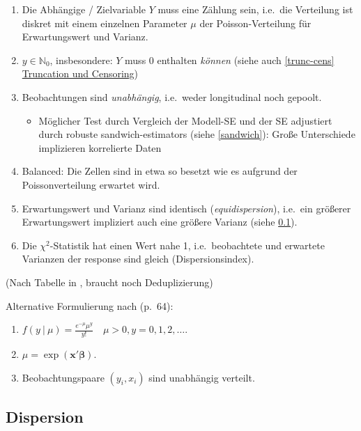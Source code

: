 \documentclass[ngerman,a4paper,]{scrartcl}
\providecommand{\tightlist}{%
  \setlength{\itemsep}{0pt}\setlength{\parskip}{0pt}}
\theoremstyle{definition}
\theoremstyle{definition}
\theoremstyle{definition}
\theoremstyle{remark}
\begin{document}
\begin{enumerate}
\def\labelenumi{\arabic{enumi}.}
\tightlist
\item
  Die Abhängige / Zielvariable \(Y\) muss eine Zählung sein, i.e.~die Verteilung ist diskret mit einem einzelnen Parameter \(\mu\) der Poisson-Verteilung für Erwartungswert und Varianz.
\item
  \(y \in \mathbb{N}_0\), insbesondere: \(Y\) muss 0 enthalten \emph{können} (siehe auch \ref{trunc-cens} \protect\hyperlink{trunc-cens}{Truncation und Censoring})
\item
  Beobachtungen sind \emph{unabhängig}, i.e.~weder longitudinal noch gepoolt.

  \begin{itemize}
  \tightlist
  \item
    Möglicher Test durch Vergleich der Modell-SE und der SE adjustiert durch robuste sandwich-estimators (siehe \ref{sandwich}): Große Unterschiede implizieren korrelierte Daten
  \end{itemize}
\item
  Balanced: Die Zellen sind in etwa so besetzt wie es aufgrund der Poissonverteilung erwartet wird.
\item
  Erwartungswert und Varianz sind identisch (\emph{equidispersion}), i.e.~ein größerer Erwartungswert impliziert auch eine größere Varianz (siehe \ref{dispersion}).
\item
  Die \(\chi^2\)-Statistik hat einen Wert nahe 1, i.e.~beobachtete und erwartete Varianzen der response sind gleich (Dispersionsindex).
\end{enumerate}

(Nach Tabelle in \citep{hilbeModelingCountData2014}, braucht noch Deduplizierung)

Alternative Formulierung nach \citet{winkelmannEconometricAnalysisCount2010} (p.~64):

\begin{enumerate}
\def\labelenumi{\arabic{enumi}.}
\tightlist
\item
  \(f(y\ |\ \mu) = \frac{e^{-\mu} \mu^y}{y!} \quad \mu > 0, y = 0, 1, 2, \ldots\).
\item
  \(\mu = \exp(\mathbf{x}' \boldsymbol{\beta})\).
\item
  Beobachtungspaare \((y_i, x_i)\) sind unabhängig verteilt.
\end{enumerate}

\hypertarget{dispersion}{%
\subsection{Dispersion}\label{dispersion}}
\end{document}
